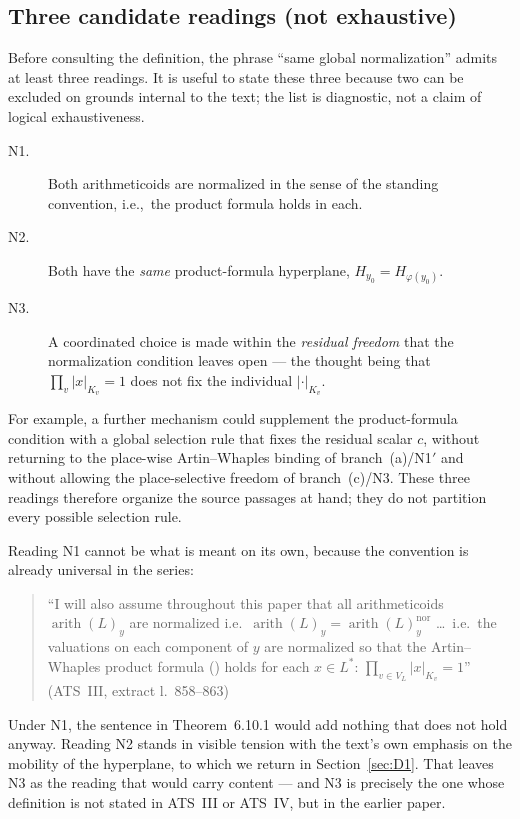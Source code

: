 \documentclass[11pt,a4paper]{article}
\theoremstyle{definition}
\theoremstyle{plain}
\theoremstyle{definition}
\newcommand{\arith}{\operatorname{arith}}
\newcommand{\anchor}[2]{(#1, extract l.~#2)}
\begin{document}
\subsection{Three candidate readings (not exhaustive)}

Before consulting the definition, the phrase ``same global normalization'' admits
at least three readings. It is useful to state these three because two can be
excluded on grounds internal to the text; the list is diagnostic, not a claim of
logical exhaustiveness.

\begin{description}
\item[N1.] Both arithmeticoids are normalized in the sense of the standing
  convention, i.e.,\ the product formula holds in each.
\item[N2.] Both have the \emph{same} product-formula hyperplane,
  $H_{y_0} = H_{\varphi(y_0)}$.
\item[N3.] A coordinated choice is made within the \emph{residual freedom} that
  the normalization condition leaves open --- the thought being that
  $\prod_v |x|_{K_v} = 1$ does not fix the individual $|\cdot|_{K_v}$.
\end{description}

For example, a further mechanism could supplement the product-formula condition
with a global selection rule that fixes the residual scalar $c$, without returning
to the place-wise Artin--Whaples binding of branch~(a)/N1$'$ and without allowing
the place-selective freedom of branch~(c)/N3. These three readings therefore organize the
source passages at hand; they do not partition every possible selection rule.

Reading N1 cannot be what is meant on its own, because the convention is already
universal in the series:

\begin{quote}\small
``I will also assume throughout this paper that all arithmeticoids $\arith(L)_y$
are normalized i.e.\ $\arith(L)_y = \arith(L)^{\mathrm{nor}}_y$ \ldots\ i.e.\ the
valuations on each component of $y$ are normalized so that the Artin--Whaples
product formula (\cite{ArtinWhaples1945}) holds for each $x \in L^*$:
$\prod_{v \in V_L} |x|_{K_v} = 1$'' \hfill\anchor{ATS~III}{858--863}
\end{quote}

Under N1, the sentence in Theorem~6.10.1 would add nothing that does not hold
anyway. Reading N2 stands in visible tension with the text's own emphasis on the
mobility of the hyperplane, to which we return in Section~\ref{sec:D1}. That
leaves N3 as the reading that would carry content --- and N3 is precisely the one
whose definition is not stated in ATS~III or ATS~IV, but in the earlier paper.
\end{document}
